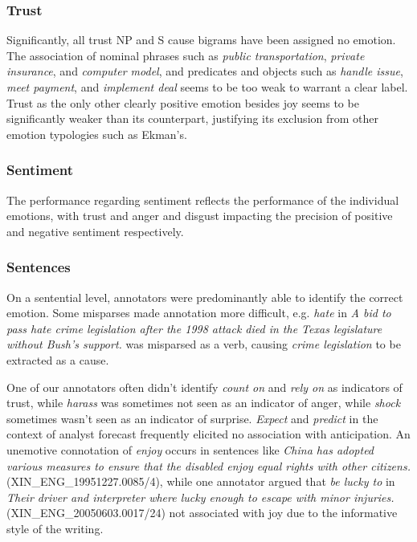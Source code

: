 \subsubsection{Trust}

Significantly, all trust NP and S cause bigrams have been assigned no emotion. The association of nominal phrases such as \textit{public transportation}, \textit{private insurance}, and \textit{computer model}, and predicates and objects such as \textit{handle issue}, \textit{meet payment}, and \textit{implement deal} seems to be too weak to warrant a clear label. Trust as the only other clearly positive emotion besides joy seems to be significantly weaker than its counterpart, justifying its exclusion from other emotion typologies such as Ekman's.

\subsubsection{Sentiment}

The performance regarding sentiment reflects the performance of the individual emotions, with trust and anger and disgust impacting the precision of positive and negative sentiment respectively.

\subsubsection{Sentences}

On a sentential level, annotators were predominantly able to identify the correct emotion. Some misparses made annotation more difficult, e.g. \textit{hate} in \textit{A bid to pass hate crime legislation after the 1998 attack died in the Texas legislature without Bush's support.} was misparsed as a verb, causing \textit{crime legislation} to be extracted as a cause.

One of our annotators often didn't identify \textit{count on} and \textit{rely on} as indicators of trust, while \textit{harass} was sometimes not seen as an indicator of anger, while \textit{shock} sometimes wasn't seen as an indicator of surprise. \textit{Expect} and \textit{predict} in the context of analyst forecast frequently elicited no association with anticipation. An unemotive connotation of \textit{enjoy} occurs in sentences like \textit{China has adopted various measures to ensure that the disabled enjoy equal rights with other citizens.} (XIN\_ENG\_19951227.0085/4), while one annotator argued that \textit{be lucky to} in \textit{Their driver and interpreter where lucky enough to escape with minor injuries.} (XIN\_ENG\_20050603.0017/24) not associated with joy due to the informative style of the writing.

